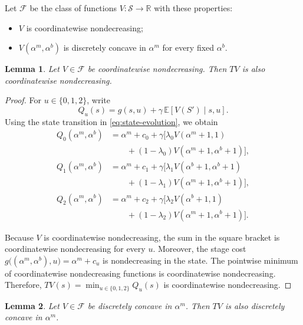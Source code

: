 \documentclass[letterpaper,journal]{IEEEtran}
\newtheorem{lemma}{Lemma}
\begin{document}
Let $\mathcal F$ be the class of functions $V:\mathcal S\to\mathbb R$ with these properties:
\begin{itemize}
    \item $V$ is coordinatewise nondecreasing;
    \item $V(\alpha^m, \alpha^b)$ is discretely concave in $\alpha^m$ for every fixed $\alpha^b$.
\end{itemize}

\begin{lemma}\label{lemma:TV-nondecreasing}
Let $V\in \mathcal F$ be coordinatewise nondecreasing. Then $TV$ is also coordinatewise nondecreasing.
\end{lemma}

\begin{proof}
For $u\in\{0,1,2\}$, write
\[
Q_u(s)=g(s,u)+\gamma\,\mathbb E[V(S')\mid s,u].
\]
Using the state transition in \eqref{eq:state-evolution}, we obtain
\begin{align*}
Q_0(\alpha^m,\alpha^b)
&=\alpha^m+c_0+\gamma\bigl[\lambda_0 V(\alpha^m+1,1)\\
&\qquad +(1-\lambda_0)V(\alpha^m+1,\alpha^b+1)\bigr],\\
Q_1(\alpha^m,\alpha^b)
&=\alpha^m+c_1+\gamma\bigl[\lambda_1 V(\alpha^b+1,\alpha^b+1)\\
&\qquad +(1-\lambda_1)V(\alpha^m+1,\alpha^b+1)\bigr],\\
Q_2(\alpha^m,\alpha^b)
&=\alpha^m+c_2+\gamma\bigl[\lambda_2 V(\alpha^b+1,1)\\
&\qquad +(1-\lambda_2)V(\alpha^m+1,\alpha^b+1)\bigr].
\end{align*}

Because $V$ is coordinatewise nondecreasing, the sum in the square bracket is coordinatewise nondecreasing for every $u$. Moreover, the stage cost $g\bigl((\alpha^m,\alpha^b),u\bigr)=\alpha^m+c_u$ is nondecreasing in the state. The pointwise minimum of coordinatewise nondecreasing functions is coordinatewise nondecreasing. Therefore, $TV(s)=\min_{u\in\{0,1,2\}}Q_u(s)$ is coordinatewise nondecreasing.
\end{proof}

\begin{lemma}\label{lemma:rowwise-discrete-concavity}
Let $V\in \mathcal F$ be discretely concave in $\alpha^m$. Then $TV$ is also discretely concave in $\alpha^m$.
\end{lemma}
\end{document}
